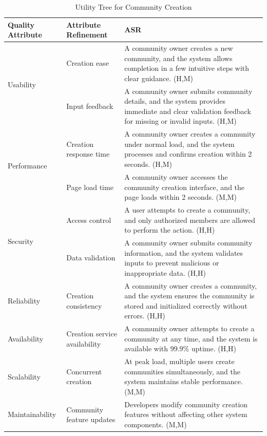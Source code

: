 \documentclass{article}
\begin{document}
\begin{table}[H]
\centering
\caption{Utility Tree for Community Creation}
\begin{tabular}{|p{3cm}|p{4cm}|p{7cm}|}
\hline
\textbf{Quality Attribute} & \textbf{Attribute Refinement} & \textbf{ASR} \\
\hline

\multirow{2}{*}{Usability}
& Creation ease
& A community owner creates a new community, and the system allows completion in a few intuitive steps with clear guidance. (H,M) \\
\cline{2-3}
& Input feedback
& A community owner submits community details, and the system provides immediate and clear validation feedback for missing or invalid inputs. (H,M) \\
\hline

\multirow{2}{*}{Performance}
& Creation response time
& A community owner creates a community under normal load, and the system processes and confirms creation within 2 seconds. (H,M) \\
\cline{2-3}
& Page load time
& A community owner accesses the community creation interface, and the page loads within 2 seconds. (M,M) \\
\hline

\multirow{2}{*}{Security}
& Access control
& A user attempts to create a community, and only authorized members are allowed to perform the action. (H,H) \\
\cline{2-3}
& Data validation
& A community owner submits community information, and the system validates inputs to prevent malicious or inappropriate data. (H,H) \\
\hline

Reliability
& Creation consistency
& A community owner creates a community, and the system ensures the community is stored and initialized correctly without errors. (H,H) \\
\hline

Availability
& Creation service availability
& A community owner attempts to create a community at any time, and the system is available with 99.9\% uptime. (H,H) \\
\hline

Scalability
& Concurrent creation
& At peak load, multiple users create communities simultaneously, and the system maintains stable performance. (M,M) \\
\hline

Maintainability
& Community feature updates
& Developers modify community creation features without affecting other system components. (M,M) \\
\hline


\end{tabular}
\end{table}
\end{document}
